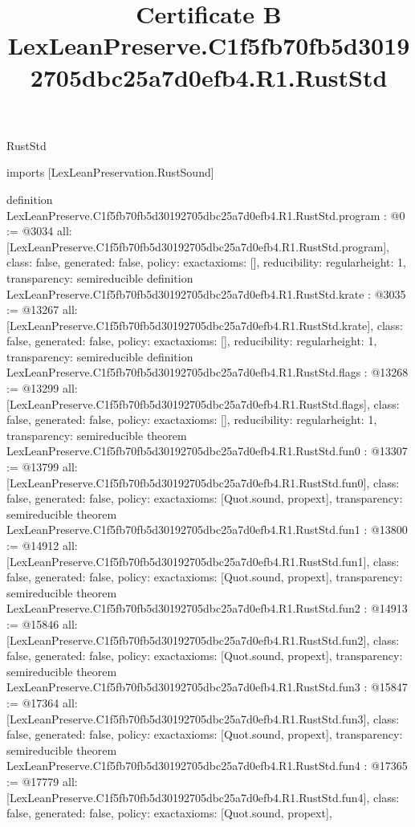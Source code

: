 \begin{lexlean}{RustStd}
\title{Certificate B LexLeanPreserve.C1f5fb70fb5d30192705dbc25a7d0efb4.R1.RustStd}
\begin{coremodule}
imports [LexLeanPreservation.RustSound]

definition LexLeanPreserve.C1f5fb70fb5d30192705dbc25a7d0efb4.R1.RustStd.program : @0 := @3034 {
  all: [LexLeanPreserve.C1f5fb70fb5d30192705dbc25a7d0efb4.R1.RustStd.program],
  class: false,
  generated: false,
  policy: exact{axioms: []},
  reducibility: regular{height: 1},
  transparency: semireducible
}
definition LexLeanPreserve.C1f5fb70fb5d30192705dbc25a7d0efb4.R1.RustStd.krate : @3035 := @13267 {
  all: [LexLeanPreserve.C1f5fb70fb5d30192705dbc25a7d0efb4.R1.RustStd.krate],
  class: false,
  generated: false,
  policy: exact{axioms: []},
  reducibility: regular{height: 1},
  transparency: semireducible
}
definition LexLeanPreserve.C1f5fb70fb5d30192705dbc25a7d0efb4.R1.RustStd.flags : @13268 := @13299 {
  all: [LexLeanPreserve.C1f5fb70fb5d30192705dbc25a7d0efb4.R1.RustStd.flags],
  class: false,
  generated: false,
  policy: exact{axioms: []},
  reducibility: regular{height: 1},
  transparency: semireducible
}
theorem LexLeanPreserve.C1f5fb70fb5d30192705dbc25a7d0efb4.R1.RustStd.fun0 : @13307 := @13799 {
  all: [LexLeanPreserve.C1f5fb70fb5d30192705dbc25a7d0efb4.R1.RustStd.fun0],
  class: false,
  generated: false,
  policy: exact{axioms: [Quot.sound, propext]},
  transparency: semireducible
}
theorem LexLeanPreserve.C1f5fb70fb5d30192705dbc25a7d0efb4.R1.RustStd.fun1 : @13800 := @14912 {
  all: [LexLeanPreserve.C1f5fb70fb5d30192705dbc25a7d0efb4.R1.RustStd.fun1],
  class: false,
  generated: false,
  policy: exact{axioms: [Quot.sound, propext]},
  transparency: semireducible
}
theorem LexLeanPreserve.C1f5fb70fb5d30192705dbc25a7d0efb4.R1.RustStd.fun2 : @14913 := @15846 {
  all: [LexLeanPreserve.C1f5fb70fb5d30192705dbc25a7d0efb4.R1.RustStd.fun2],
  class: false,
  generated: false,
  policy: exact{axioms: [Quot.sound, propext]},
  transparency: semireducible
}
theorem LexLeanPreserve.C1f5fb70fb5d30192705dbc25a7d0efb4.R1.RustStd.fun3 : @15847 := @17364 {
  all: [LexLeanPreserve.C1f5fb70fb5d30192705dbc25a7d0efb4.R1.RustStd.fun3],
  class: false,
  generated: false,
  policy: exact{axioms: [Quot.sound, propext]},
  transparency: semireducible
}
theorem LexLeanPreserve.C1f5fb70fb5d30192705dbc25a7d0efb4.R1.RustStd.fun4 : @17365 := @17779 {
  all: [LexLeanPreserve.C1f5fb70fb5d30192705dbc25a7d0efb4.R1.RustStd.fun4],
  class: false,
  generated: false,
  policy: exact{axioms: [Quot.sound, propext]},
}
\end{coremodule}
\end{lexlean}
